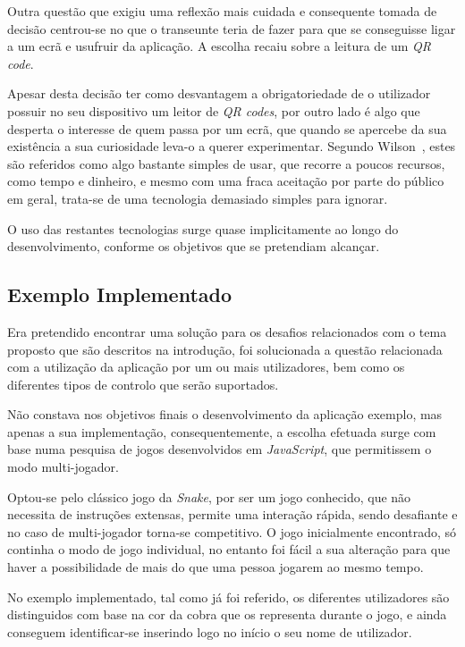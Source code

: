 Outra questão que exigiu uma reflexão mais cuidada e consequente tomada de decisão centrou-se no que o transeunte teria de fazer para que se conseguisse ligar a um ecrã e usufruir da aplicação. A escolha recaiu sobre a leitura de um \textit{QR code}. 

Apesar desta decisão ter como desvantagem a obrigatoriedade de o utilizador possuir no seu dispositivo um leitor de \textit{QR codes}, por outro lado é algo que desperta o interesse de quem passa por um ecrã, que quando se apercebe da sua existência a sua curiosidade leva-o a querer experimentar. Segundo Wilson~\cite{Wilson2014}, estes são referidos como algo bastante simples de usar, que recorre a poucos recursos, como tempo e dinheiro, e mesmo com uma fraca aceitação por parte do público em geral, trata-se de uma tecnologia demasiado simples para ignorar.

O uso das restantes tecnologias surge quase implicitamente ao longo do desenvolvimento, conforme os objetivos que se pretendiam alcançar.

\subsection*{Exemplo Implementado}

Era pretendido encontrar uma solução para os desafios relacionados com o tema proposto que são descritos na introdução, foi solucionada a questão relacionada com a utilização da aplicação por um ou mais utilizadores, bem como os diferentes tipos de controlo que serão suportados.

Não constava nos objetivos finais o desenvolvimento da aplicação exemplo, mas apenas a sua implementação, consequentemente, a escolha efetuada surge com base numa pesquisa de jogos desenvolvidos em \textit{JavaScript}, que permitissem o modo multi-jogador. 

Optou-se pelo clássico jogo da \textit{Snake}, por ser um jogo conhecido, que não necessita de instruções extensas, permite uma interação rápida, sendo desafiante e no caso de multi-jogador torna-se competitivo. O jogo inicialmente encontrado, só continha o modo de jogo individual, no entanto foi fácil a sua alteração para que haver a possibilidade de mais do que uma pessoa jogarem ao mesmo tempo.

No exemplo implementado, tal como já foi referido, os diferentes utilizadores são distinguidos com base na cor da cobra que os representa durante o jogo, e ainda conseguem identificar-se inserindo logo no início o seu nome de utilizador. 

